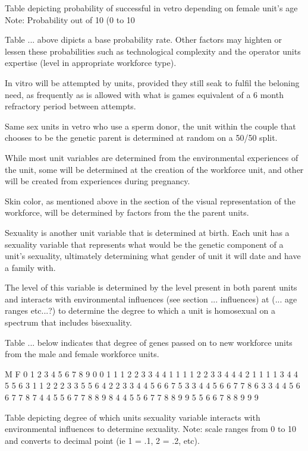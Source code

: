 Table depicting probability of successful in vetro depending on female unit's age
Note: Probability out of 10 (0 to 10

Table ... above dipicts a base probability rate. Other factors may highten or lessen these probabilities such as technological complexity and the operator units expertise (level in appropriate workforce type).

In vitro will be attempted by units, provided they still seak to fulfil the beloning need, as frequently as is allowed with what is games equivalent of a 6 month refractory period between attempts.

Same sex units in vetro who use a sperm donor, the unit within the couple that chooses to be the genetic parent is determined at random on a 50/50 split.


While most unit variables are determined from the environmental experiences of the unit, some will be determined at the creation of the workforce unit, and other will be created from experiences during pregnancy.

Skin color, as mentioned above in the section of the visual representation of the workforce, will be determined by factors from the the parent units.

Sexuality is another unit variable that is determined at birth. Each unit has a sexuality variable that represents what would be the genetic component of a unit's sexuality, ultimately determining what gender of unit it will date and have a family with.

The level of this variable is determined by the level present in both parent units and interacts with environmental influences (see section ... influences) at (... age ranges etc...?) to determine the degree to which a unit is homosexual on a spectrum that includes bisexuality. 

Table ... below indicates that degree of genes passed on to new workforce units from the male and female workforce units.

   M			        
F  0  1  2  3  4  5  6  7  8  9     
0  0  1  1  1  2  2  3  3  4  4
1  1  1  1  2  2  3  3  4  4  4     
2  1  1  1  1  3  4  4  5  5  6     
3  1  1  2  2  2  3  3  5  5  6     
4  2  2  3  3  4  4  5  6  6  7     
5  3  3  4  4  5  6  6  7  7  8     
6  3  3  4  4  5  6  6  7  7  8     
7  4  4  5  5  6  7  7  8  8  9      
8  4  4  5  5  6  7  7  8  8  9       
9  5  5  6  6  7  8  8  9  9  9

Table depicting degree of which units sexuality variable interacts with environmental influences to determine sexuality.
Note: scale ranges from 0 to 10 and converts to decimal point (ie 1 = .1, 2 = .2, etc).


